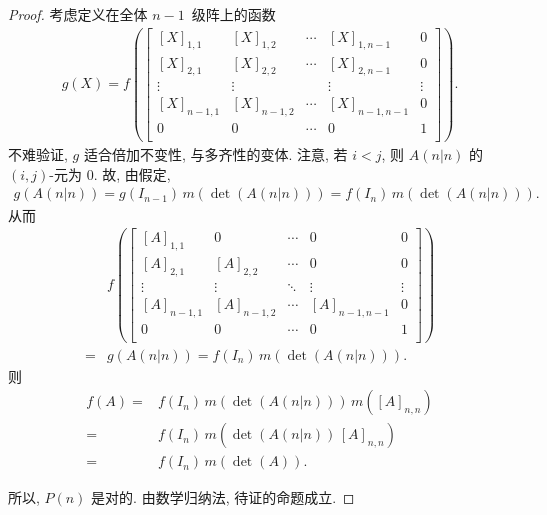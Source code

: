 \documentclass[../libro.tex]{subfiles}
\begin{document}
\begin{proof}
    考虑定义在全体 \(n-1\)~级阵上的函数
    \begin{align*}
        g(X)
        =
        f\left(
            \begin{bmatrix}
                [X]_{1,1}   & [X]_{1,2}   & \cdots & [X]_{1,n-1}   & 0      \\
                [X]_{2,1}   & [X]_{2,2}   & \cdots & [X]_{2,n-1}   & 0      \\
                \vdots      & \vdots      & {}     & \vdots        & \vdots \\
                [X]_{n-1,1} & [X]_{n-1,2} & \cdots & [X]_{n-1,n-1} & 0      \\
                0           & 0           & \cdots & 0             & 1      \\
            \end{bmatrix}
        \right).
    \end{align*}
    不难验证, \(g\) 适合倍加不变性, 与多齐性的变体.
    注意, 若 \(i < j\),
    则 \(A(n|n)\) 的 \((i, j)\)-元为 \(0\).
    故, 由假定,
    \begin{align*}
        g(A(n|n)) = g(I_{n-1})\, m(\det {(A(n|n))})
        = f(I_n)\, m(\det {(A(n|n))}).
    \end{align*}
    从而
    \begin{align*}
        &
        f\left(
            \begin{bmatrix}
                [A]_{1,1}   & 0           & \cdots & 0             & 0      \\
                [A]_{2,1}   & [A]_{2,2}   & \cdots & 0             & 0      \\
                \vdots      & \vdots      & \ddots & \vdots        & \vdots \\
                [A]_{n-1,1} & [A]_{n-1,2} & \cdots & [A]_{n-1,n-1} & 0      \\
                0           & 0           & \cdots & 0             & 1      \\
            \end{bmatrix}
        \right)
        \\
        = {} &
        g(A(n|n)) = f(I_n)\, m(\det {(A(n|n))}).
    \end{align*}
    则
    \begin{align*}
        f(A)
        = {} & f(I_n)\, m(\det {(A(n|n))}) \,m([A]_{n,n}) \\
        = {} & f(I_n)\, m(\det {(A(n|n))} \,[A]_{n,n})    \\
        = {} & f(I_n)\, m(\det {(A)}).
    \end{align*}

    所以, \(P(n)\) 是对的.
    由数学归纳法, 待证的命题成立.
\end{proof}
\end{document}
